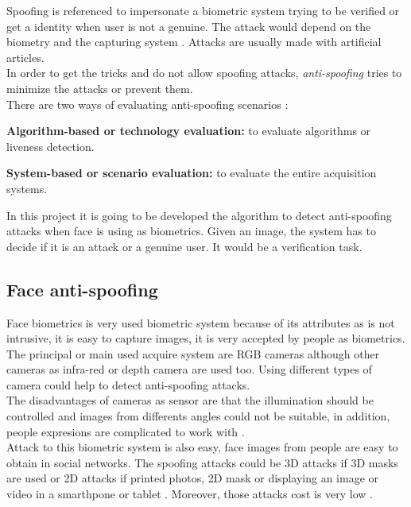 Spoofing is referenced to impersonate a biometric system trying to be verified or get a identity when user is not a genuine. The attack would depend on the biometry and the capturing system \cite{Spoofing_survey}. Attacks are usually made with artificial articles.\\

In order to get the tricks and do not allow spoofing attacks, \textit{anti-spoofing} tries to minimize the attacks or prevent them.\\

There are two ways of evaluating anti-spoofing scenarios \cite{Spoofing_survey}:
\begin{description}[noitemsep,topsep=8pt,parsep=0pt,partopsep=20pt]
\item \textbf{Algorithm-based or technology evaluation:} to evaluate algorithms or liveness detection.
\item \textbf{System-based or scenario evaluation:} to evaluate the entire acquisition systems.
\end{description}

In this project it is going to be developed the algorithm to detect anti-spoofing attacks when face is using as biometrics. Given an image, the system has to decide if it is an attack or a genuine user. It would be a verification task.\\

\subsection{Face anti-spoofing}
Face biometrics is very used biometric system because of its attributes as is not intrusive, it is easy to capture images, it is very accepted by people as biometrics. \\

The principal or main used acquire system are RGB cameras although other cameras as infra-red  or depth camera are used too. Using different types of camera could help to detect anti-spoofing attacks.\\

The disadvantages of cameras as sensor are that the illumination should be controlled and images from differents angles could not be suitable, in addition, people expresions are complicated to work with \cite{survey2}.\\

Attack to this biometric system is also easy, face images from people are easy to obtain in social networks. The spoofing attacks could be 3D attacks if 3D masks are used or 2D attacks if printed photos, 2D mask or displaying an image or video in a smarthpone or tablet \cite{2d_3d_face}. Moreover, those attacks cost is very low \cite{distorsion}.\\ 


